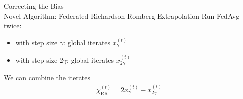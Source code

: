 \documentclass[aspectratio=169,12pt]{beamer}
\begin{document}
\begin{frame}{Correcting the Bias\\[-0.2em]
\large Novel Algorithm: Federated Richardson-Romberg Extrapolation}
    Run FedAvg twice:
    \begin{itemize}
        \item with step size $\gamma$: global iterates $x_{\gamma}^{(t)}$
        \item with step size $2 \gamma$: global iterates $x_{2 \gamma}^{(t)}$
    \end{itemize}

    We can combine the iterates
    \begin{align*}
        \chi_{\text{RR}}^{(t)}
        =
        2 x_{\gamma}^{(t)}
        - x_{2 \gamma}^{(t)}
    \end{align*}

    \pause
\end{frame}
\end{document}
